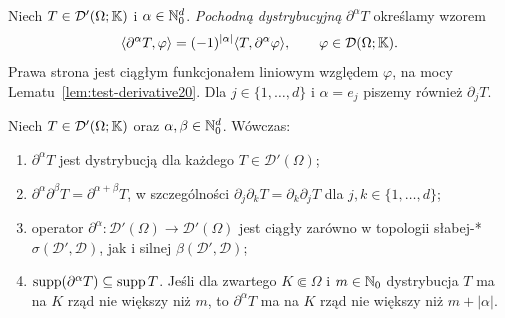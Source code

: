 \begin{definicja}
\label{def:dist-deriv20}
Niech $T\in\mathcal D'(\Omega;\mathbb K)$ i $\alpha\in\mathbb N_0^d$.
\emph{Pochodną dystrybucyjną} $\partial^\alpha T$ określamy wzorem
\[
 \langle\partial^\alpha T,\varphi\rangle
 =(-1)^{|\alpha|}\langle T,\partial^\alpha\varphi\rangle,
 \qquad\varphi\in\mathcal D(\Omega;\mathbb K).
\]
Prawa strona jest ciągłym funkcjonałem liniowym względem $\varphi$,
na mocy Lematu~\ref{lem:test-derivative20}.
Dla $j\in\{1,\ldots,d\}$ i $\alpha=e_j$ piszemy również $\partial_jT$.
\end{definicja}

\begin{twierdzenie}
\label{thm:dist-deriv-cont20}
Niech $T\in\mathcal D'(\Omega;\mathbb K)$ oraz
$\alpha,\beta\in\mathbb N_0^d$. Wówczas:
\begin{enumerate}
\item $\partial^\alpha T$ jest dystrybucją dla każdego
$T\in\mathcal D'(\Omega)$;
\item $\partial^\alpha\partial^\beta T
=\partial^{\alpha+\beta}T$, w szczególności
$\partial_j\partial_kT=\partial_k\partial_jT$
dla $j,k\in\{1,\ldots,d\}$;
\item operator $\partial^\alpha:\mathcal D'(\Omega)\to
\mathcal D'(\Omega)$ jest ciągły zarówno w topologii słabej-*
$\sigma(\mathcal D',\mathcal D)$, jak i silnej
$\beta(\mathcal D',\mathcal D)$;
\item $\operatorname{supp}(\partial^\alpha T)\subseteq\operatorname{supp} T$.
Jeśli dla zwartego $K\Subset\Omega$ i $m\in\mathbb N_0$
dystrybucja $T$ ma na $K$ rząd nie większy niż $m$,
to $\partial^\alpha T$ ma na $K$ rząd nie większy niż
$m+|\alpha|$.
\end{enumerate}
\end{twierdzenie}
